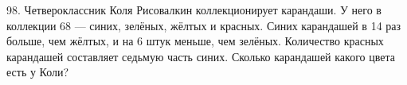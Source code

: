 98. Четвероклассник Коля Рисовалкин коллекционирует карандаши. У него в коллекции 68 --- синих, зелёных, жёлтых и красных. Синих карандашей в 14 раз больше, чем жёлтых, и на 6 штук меньше, чем зелёных. Количество красных карандашей составляет седьмую часть синих. Сколько карандашей какого цвета есть у Коли?\\
